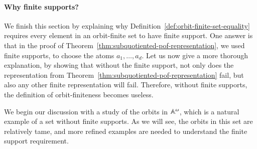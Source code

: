 \paragraph*{Why finite supports?} We finish this section by explaining why Definition~\ref{def:orbit-finite-set-equality} requires every element in an orbit-finite set to have finite support.  One answer is that in the proof of Theorem~\ref{thm:subquotiented-pof-representation}, we used finite supports, to choose the atoms  $a_1,\ldots,a_d$. Let us now give a more thorough explanation, by showing that without the finite support, not only does the representation from Theorem~\ref{thm:subquotiented-pof-representation} fail, but also any other  finite representation will fail.  Therefore, without finite supports, the definition of orbit-finiteness becomes useless.

We begin our discussion with a study of the orbits in $\mathbb A^\omega$, which is a natural example of a set without finite supports. As we will see, the orbits in this set are relatively tame, and more refined examples are needed to understand the finite support requirement.





